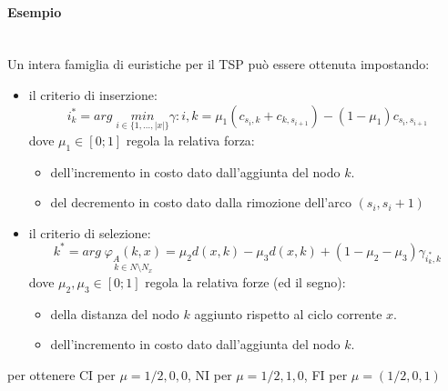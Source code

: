 \documentclass{article}
\begin{document}
\paragraph{Esempio}\mbox{}\\
Un intera famiglia di euristiche per il TSP può essere ottenuta impostando:
\begin{itemize}
    \item il criterio di inserzione:
          $$i^*_k=arg\;\underset{i\in\{1,\dots,|x|\}}{min}\gamma:{i,k}=\mu_1(c_{s_i,k}+c_{k,s_{i+1}})-(1-\mu_1)c_{s_i,s_{i+1}}$$
          dove $\mu_1\in[0;1]$ regola la relativa forza:
          \begin{itemize}
              \item dell'incremento in costo dato dall'aggiunta del nodo $k$.
              \item del decremento in costo dato dalla rimozione dell'arco $(s_i, s_i+1)$
          \end{itemize}
    \item il criterio di selezione:
          $$k^* = arg\;\underset{k\in N\setminus N_x}{\varphi_A(k,x)}= \mu_2 d(x,k)-\mu_3 d(x,k)+(1-\mu_2-\mu_3)\gamma_{i^*_k,k}$$
          dove $\mu_2,\mu_3\in[0;1]$ regola la relativa forze (ed il segno):
          \begin{itemize}
              \item della distanza del nodo $k$ aggiunto rispetto al ciclo corrente $x$.
              \item dell'incremento in costo dato dall'aggiunta del nodo $k$.
          \end{itemize}
\end{itemize}
per ottenere CI per $\mu={1/2,0,0}$, NI per $\mu={1/2,1,0}$, FI per $\mu=(1/2,0,1)$
\end{document}
